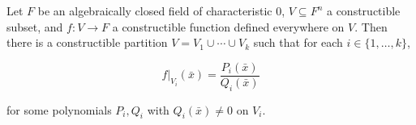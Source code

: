 Let $F$ be an algebraically closed field of characteristic $0$, $V \subseteq F^n$ a constructible subset, and $f : V \to F$ a constructible function defined everywhere on $V$. Then there is a constructible partition $V = V_1 \cup \cdots \cup V_k$ such that for each $i \in \{1, \ldots, k\}$,

$$f|_{V_i}(\bar{x}) = \frac{P_i(\bar{x})}{Q_i(\bar{x})}$$

for some polynomials $P_i, Q_i$ with $Q_i(\bar{x}) \neq 0$ on $V_i$.
